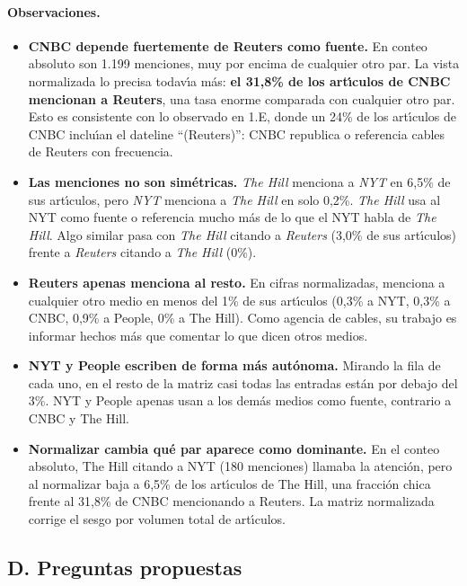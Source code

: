 \documentclass[11pt,a4paper]{article}
\begin{document}
\paragraph{Observaciones.}
\begin{itemize}
    \item \textbf{CNBC depende fuertemente de Reuters como fuente.} En conteo absoluto son 1.199 menciones, muy por encima de cualquier otro par. La vista normalizada lo precisa todav\'{\i}a m\'{a}s: \textbf{el 31,8\% de los art\'{\i}culos de CNBC mencionan a Reuters}, una tasa enorme comparada con cualquier otro par. Esto es consistente con lo observado en 1.E, donde un 24\% de los art\'{\i}culos de CNBC inclu\'{\i}an el dateline ``(Reuters)'': CNBC republica o referencia cables de Reuters con frecuencia.
    \item \textbf{Las menciones no son sim\'{e}tricas.} \textit{The Hill} menciona a \textit{NYT} en 6,5\% de sus art\'{\i}culos, pero \textit{NYT} menciona a \textit{The Hill} en solo 0,2\%. \textit{The Hill} usa al NYT como fuente o referencia mucho m\'{a}s de lo que el NYT habla de \textit{The Hill}. Algo similar pasa con \textit{The Hill} citando a \textit{Reuters} (3,0\% de sus art\'{\i}culos) frente a \textit{Reuters} citando a \textit{The Hill} (0\%).
    \item \textbf{Reuters apenas menciona al resto.} En cifras normalizadas, menciona a cualquier otro medio en menos del 1\% de sus art\'{\i}culos (0,3\% a NYT, 0,3\% a CNBC, 0,9\% a People, 0\% a The Hill). Como agencia de cables, su trabajo es informar hechos m\'{a}s que comentar lo que dicen otros medios.
    \item \textbf{NYT y People escriben de forma m\'{a}s aut\'{o}noma.} Mirando la fila de cada uno, en el resto de la matriz casi todas las entradas est\'{a}n por debajo del 3\%. NYT y People apenas usan a los dem\'{a}s medios como fuente, contrario a CNBC y The Hill.
    \item \textbf{Normalizar cambia qu\'{e} par aparece como dominante.} En el conteo absoluto, The Hill citando a NYT (180 menciones) llamaba la atenci\'{o}n, pero al normalizar baja a 6,5\% de los art\'{\i}culos de The Hill, una fracci\'{o}n chica frente al 31,8\% de CNBC mencionando a Reuters. La matriz normalizada corrige el sesgo por volumen total de art\'{\i}culos.
\end{itemize}

\subsection{D. Preguntas propuestas}
\end{document}
